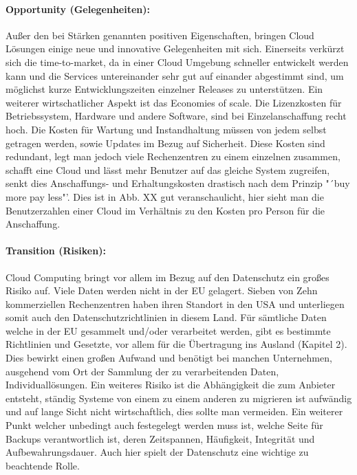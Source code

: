 \paragraph{Opportunity (Gelegenheiten):} Außer den bei Stärken genannten positiven Eigenschaften, bringen Cloud Lösungen einige neue und innovative Gelegenheiten mit sich. Einerseits verkürzt sich die time-to-market, da in einer Cloud Umgebung schneller entwickelt werden kann und die Services untereinander sehr gut auf einander abgestimmt sind, um möglichst kurze Entwicklungszeiten einzelner Releases zu unterstützen. Ein weiterer wirtschatlicher Aspekt ist das Economies of scale. Die Lizenzkosten für Betriebssystem, Hardware und andere Software, sind bei Einzelanschaffung recht hoch. Die Kosten für Wartung und Instandhaltung müssen von jedem selbst getragen werden, sowie Updates im Bezug auf Sicherheit. Diese Kosten sind redundant, legt man jedoch viele Rechenzentren zu einem einzelnen zusammen, schafft eine Cloud und lässt mehr Benutzer auf das gleiche System zugreifen, senkt dies Anschaffungs- und Erhaltungskosten drastisch nach dem Prinzip "´buy more pay less"'. Dies ist in Abb. XX gut veranschaulicht, hier sieht man die Benutzerzahlen einer Cloud im Verhältnis zu den Kosten pro Person für die Anschaffung.\\

\paragraph{Transition (Risiken):} Cloud Computing bringt vor allem im Bezug auf den Datenschutz ein großes Risiko auf. Viele Daten werden nicht in der EU gelagert. Sieben von Zehn kommerziellen Rechenzentren haben ihren Standort in den USA und unterliegen somit auch den Datenschutzrichtlinien in diesem Land. Für sämtliche Daten welche in der EU gesammelt und/oder verarbeitet werden, gibt es bestimmte Richtlinien und Gesetzte, vor allem für die Übertragung ins Ausland (Kapitel 2). Dies bewirkt einen großen Aufwand und benötigt bei manchen Unternehmen, ausgehend vom Ort der Sammlung der zu verarbeitenden Daten, Individuallösungen. Ein weiteres Risiko ist die Abhängigkeit die zum Anbieter entsteht, ständig Systeme von einem zu einem anderen zu migrieren ist aufwändig und auf lange Sicht nicht wirtschaftlich, dies sollte man vermeiden. Ein weiterer Punkt welcher unbedingt auch festegelegt werden muss ist, welche Seite für Backups verantwortlich ist, deren Zeitspannen, Häufigkeit, Integrität und Aufbewahrungsdauer. Auch hier spielt der Datenschutz eine wichtige zu beachtende Rolle.

